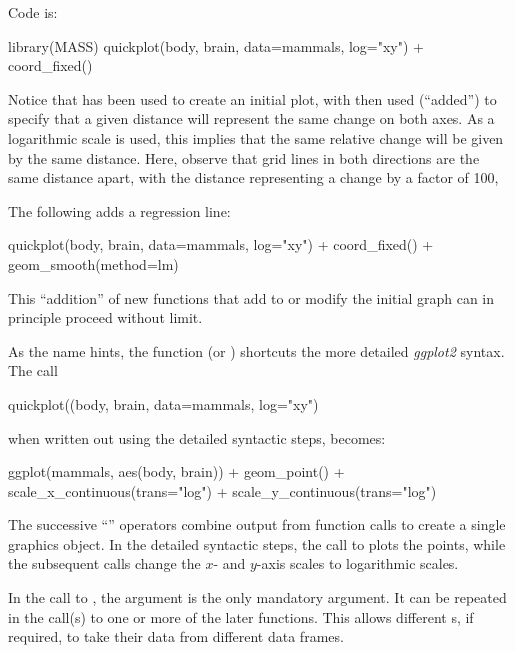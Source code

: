 \noindent Code is:
\begin{Schunk}
\begin{Sinput}
library(MASS)
quickplot(body, brain, data=mammals, log="xy") +
  coord_fixed()
\end{Sinput}
\end{Schunk}
  Notice
that  has been used to create an initial plot, with
 then used (``added'') to specify that a given
distance will represent the same change on both axes.  As a
logarithmic scale is used, this implies that the same relative change
will be given by the same distance.  Here, observe that grid lines in
both directions are the same distance apart, with the distance
representing a change by a factor of 100,

The following adds a regression line:
\begin{Schunk}
\begin{Sinput}
quickplot(body, brain, data=mammals, log="xy") +
  coord_fixed() +
  geom_smooth(method=lm)
\end{Sinput}
\end{Schunk}
This ``addition'' of new functions that add to or modify the
initial graph can in principle proceed without limit.

As the name hints, the function  (or )
shortcuts the more detailed {\em ggplot2} syntax.  The call
\begin{Schunk}
\begin{Sinput}
quickplot((body, brain, data=mammals, log="xy")
\end{Sinput}
\end{Schunk}
when written out using the detailed syntactic steps, becomes:
\begin{Schunk}
\begin{Sinput}
ggplot(mammals, aes(body, brain)) +
  geom_point() +
  scale_x_continuous(trans="log") +
  scale_y_continuous(trans="log")
\end{Sinput}
\end{Schunk}
The successive ``\txtt{+}'' operators combine output from
function calls to create a single graphics object.  In the
detailed syntactic steps, the call to 
plots the points, while the subsequent calls change the
$x$- and $y$-axis scales to logarithmic scales.

In the call to , the  argument is the
only mandatory argument. It can be repeated in the call(s) to one
or more of the later  functions. This allows different
s, if required, to take their data from different data
frames.

